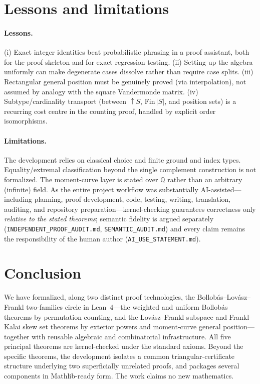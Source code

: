 \documentclass[11pt]{article}
\newcommand{\QQ}{\mathbb{Q}}
\begin{document}
\section{Lessons and limitations}\label{sec:lim}

\paragraph{Lessons.} (i) Exact integer identities beat probabilistic phrasing in a proof
assistant, both for the proof skeleton and for exact regression testing. (ii) Setting up
the algebra uniformly can make degenerate cases dissolve rather than require case
splits. (iii) Rectangular general position must be genuinely proved (via interpolation),
not assumed by analogy with the square Vandermonde matrix. (iv) Subtype/cardinality
transport (between $\uparrow S$, $\mathrm{Fin}\,|S|$, and position sets) is a recurring
cost centre in the counting proof, handled by explicit order isomorphisms.

\paragraph{Limitations.} The development relies on classical choice and finite ground
and index types. Equality/extremal classification beyond the single complement
construction is not formalized. The moment-curve layer is stated over $\QQ$ rather than
an arbitrary (infinite) field. As the entire project workflow was substantially AI-assisted---including planning, proof development, code, testing, writing, translation, auditing, and repository preparation---kernel-checking
guarantees correctness only \emph{relative to the stated theorems}; semantic fidelity is
argued separately (\texttt{INDEPENDENT\_PROOF\_AUDIT.md}, \texttt{SEMANTIC\_AUDIT.md})
and every claim remains the responsibility of the human author
(\texttt{AI\_USE\_STATEMENT.md}).

\section{Conclusion}\label{sec:concl}

We have formalized, along two distinct proof technologies, the
Bollob\'{a}s--Lov\'{a}sz--Frankl two-families circle in Lean~4---the weighted and
uniform Bollob\'{a}s theorems by permutation counting, and the Lov\'{a}sz--Frankl
subspace and Frankl--Kalai skew set theorems by exterior powers and moment-curve general
position---together with reusable algebraic and combinatorial infrastructure. All five
principal theorems are kernel-checked under the standard axioms. Beyond the specific
theorems, the development isolates a common triangular-certificate structure underlying
two superficially unrelated proofs, and packages several components in Mathlib-ready
form. The work claims no new mathematics.
\end{document}
